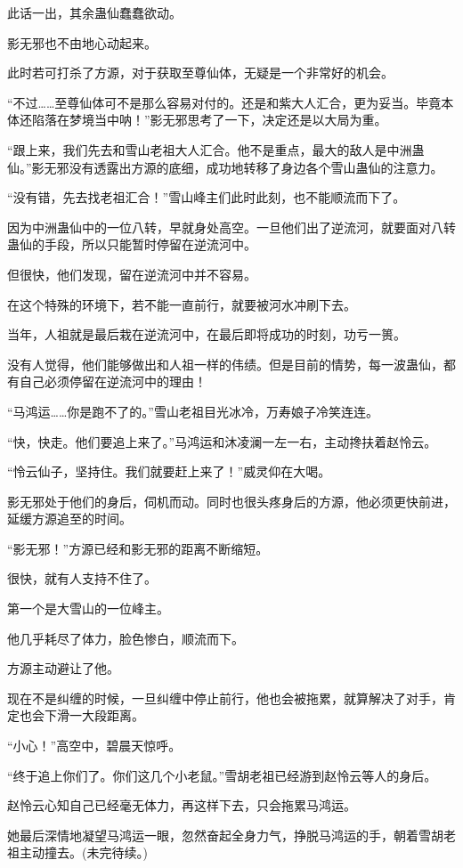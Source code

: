 \begin{this_body}
此话一出，其余蛊仙蠢蠢欲动。

影无邪也不由地心动起来。

此时若可打杀了方源，对于获取至尊仙体，无疑是一个非常好的机会。

“不过……至尊仙体可不是那么容易对付的。还是和紫大人汇合，更为妥当。毕竟本体还陷落在梦境当中呐！”影无邪思考了一下，决定还是以大局为重。

“跟上来，我们先去和雪山老祖大人汇合。他不是重点，最大的敌人是中洲蛊仙。”影无邪没有透露出方源的底细，成功地转移了身边各个雪山蛊仙的注意力。

“没有错，先去找老祖汇合！”雪山峰主们此时此刻，也不能顺流而下了。

因为中洲蛊仙中的一位八转，早就身处高空。一旦他们出了逆流河，就要面对八转蛊仙的手段，所以只能暂时停留在逆流河中。

但很快，他们发现，留在逆流河中并不容易。

在这个特殊的环境下，若不能一直前行，就要被河水冲刷下去。

当年，人祖就是最后栽在逆流河中，在最后即将成功的时刻，功亏一篑。

没有人觉得，他们能够做出和人祖一样的伟绩。但是目前的情势，每一波蛊仙，都有自己必须停留在逆流河中的理由！

“马鸿运……你是跑不了的。”雪山老祖目光冰冷，万寿娘子冷笑连连。

“快，快走。他们要追上来了。”马鸿运和沐凌澜一左一右，主动搀扶着赵怜云。

“怜云仙子，坚持住。我们就要赶上来了！”威灵仰在大喝。

影无邪处于他们的身后，伺机而动。同时也很头疼身后的方源，他必须更快前进，延缓方源追至的时间。

“影无邪！”方源已经和影无邪的距离不断缩短。

很快，就有人支持不住了。

第一个是大雪山的一位峰主。

他几乎耗尽了体力，脸色惨白，顺流而下。

方源主动避让了他。

现在不是纠缠的时候，一旦纠缠中停止前行，他也会被拖累，就算解决了对手，肯定也会下滑一大段距离。

“小心！”高空中，碧晨天惊呼。

“终于追上你们了。你们这几个小老鼠。”雪胡老祖已经游到赵怜云等人的身后。

赵怜云心知自己已经毫无体力，再这样下去，只会拖累马鸿运。

她最后深情地凝望马鸿运一眼，忽然奋起全身力气，挣脱马鸿运的手，朝着雪胡老祖主动撞去。(未完待续。)

\end{this_body}

